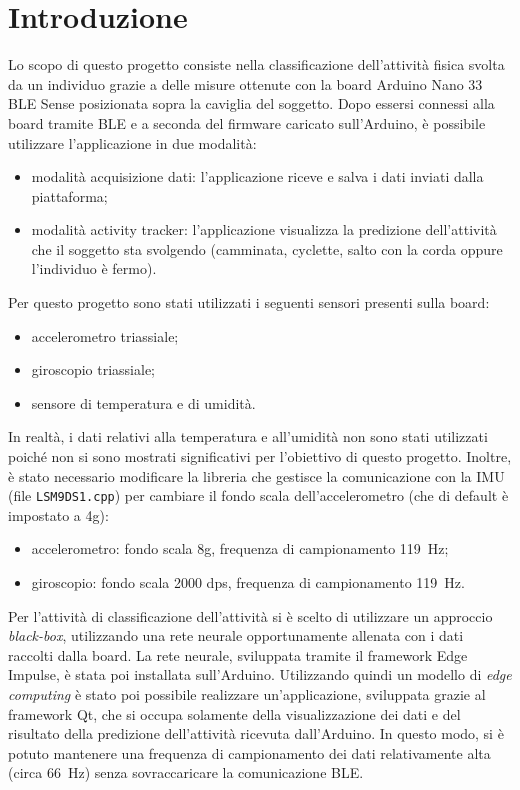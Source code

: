 \section{Introduzione}
Lo scopo di questo progetto consiste nella classificazione dell'attività fisica svolta da un individuo grazie a delle misure ottenute con la board Arduino Nano 33 BLE Sense posizionata sopra la caviglia del soggetto. Dopo essersi connessi alla board tramite BLE e a seconda del firmware caricato sull'Arduino, è possibile utilizzare l'applicazione in due modalità:
\begin{itemize}
	\item modalità acquisizione dati: l'applicazione riceve e salva i dati inviati dalla piattaforma;
	\item modalità activity tracker: l'applicazione visualizza la predizione dell'attività che il soggetto sta svolgendo (camminata, cyclette, salto con la corda oppure l'individuo è fermo).
\end{itemize}
Per questo progetto sono stati utilizzati i seguenti sensori presenti sulla board:
\begin{itemize}
	\item accelerometro triassiale; 
	\item giroscopio triassiale;
	\item sensore di temperatura e di umidità.
\end{itemize}
In realtà, i dati relativi alla temperatura e all'umidità non sono stati utilizzati poiché non si sono mostrati significativi per l'obiettivo di questo progetto. Inoltre, è stato necessario modificare la libreria che gestisce la comunicazione con la IMU (file \texttt{LSM9DS1.cpp}) per cambiare il fondo scala dell'accelerometro (che di default è impostato a 4g):
\begin{itemize}
	\item accelerometro: fondo scala 8g, frequenza di campionamento \SI{119}{\hertz}; 
	\item giroscopio: fondo scala 2000 dps, frequenza di campionamento \SI{119}{\hertz}.
\end{itemize}

Per l'attività di classificazione dell'attività si è scelto di utilizzare un approccio \textit{black-box}, utilizzando una rete neurale opportunamente allenata con i dati raccolti dalla board. La rete neurale, sviluppata tramite il framework Edge Impulse, è stata poi installata sull'Arduino. Utilizzando quindi un modello di \textit{edge computing} è stato poi possibile realizzare un'applicazione, sviluppata grazie al framework Qt, che si occupa solamente della visualizzazione dei dati e del risultato della predizione dell'attività ricevuta dall'Arduino. In questo modo, si è potuto mantenere una frequenza di campionamento dei dati relativamente alta (circa \SI{66}{\hertz}) senza sovraccaricare la comunicazione BLE.

